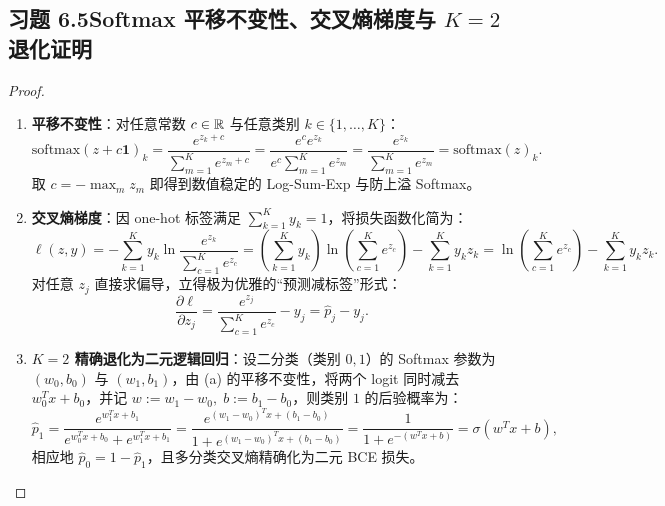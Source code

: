 \subsection*{习题 6.5\quad Softmax 平移不变性、交叉熵梯度与 $K=2$ 退化证明}
\begin{proof}
\begin{enumerate}[label=(\alph*), leftmargin=1.8em]
  \item \textbf{平移不变性}：对任意常数 $c \in \mathbb{R}$ 与任意类别 $k \in \{1,\dots,K\}$：
  \[
    \mathrm{softmax}(z + c\mathbf{1})_k
    = \frac{e^{z_k + c}}{\sum_{m=1}^K e^{z_m + c}}
    = \frac{e^c e^{z_k}}{e^c \sum_{m=1}^K e^{z_m}}
    = \frac{e^{z_k}}{\sum_{m=1}^K e^{z_m}} = \mathrm{softmax}(z)_k.
  \]
  取 $c = -\max_m z_m$ 即得到数值稳定的 Log-Sum-Exp 与防上溢 Softmax。
  \item \textbf{交叉熵梯度}：因 one-hot 标签满足 $\sum_{k=1}^K y_k = 1$，将损失函数化简为：
  \[
    \ell(z, y) = -\sum_{k=1}^K y_k \ln\frac{e^{z_k}}{\sum_{c=1}^K e^{z_c}}
    = \left(\sum_{k=1}^K y_k\right)\ln\!\left(\sum_{c=1}^K e^{z_c}\right) - \sum_{k=1}^K y_k z_k
    = \ln\!\left(\sum_{c=1}^K e^{z_c}\right) - \sum_{k=1}^K y_k z_k.
  \]
  对任意 $z_j$ 直接求偏导，立得极为优雅的“预测减标签”形式：
  \[
    \frac{\partial \ell}{\partial z_j}
    = \frac{e^{z_j}}{\sum_{c=1}^K e^{z_c}} - y_j = \hat{p}_j - y_j.
  \]
  \item \textbf{$K=2$ 精确退化为二元逻辑回归}：设二分类（类别 $0, 1$）的 Softmax 参数为 $(w_0, b_0)$ 与 $(w_1, b_1)$，由 (a) 的平移不变性，将两个 logit 同时减去 $w_0^T x + b_0$，并记 $w := w_1 - w_0,\; b := b_1 - b_0$，则类别 $1$ 的后验概率为：
  \[
    \hat{p}_1 = \frac{e^{w_1^T x + b_1}}{e^{w_0^T x + b_0} + e^{w_1^T x + b_1}}
              = \frac{e^{(w_1-w_0)^T x + (b_1-b_0)}}{1 + e^{(w_1-w_0)^T x + (b_1-b_0)}}
              = \frac{1}{1 + e^{-(w^T x + b)}} = \sigma(w^T x + b),
  \]
  相应地 $\hat{p}_0 = 1 - \hat{p}_1$，且多分类交叉熵精确化为二元 BCE 损失。
\end{enumerate}
\end{proof}

